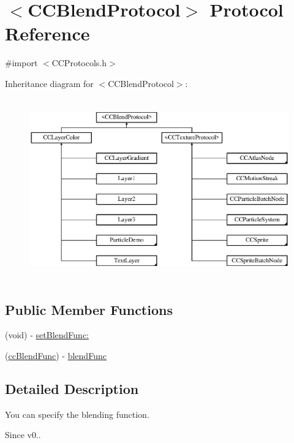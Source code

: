 \hypertarget{protocol_c_c_blend_protocol-p}{\section{$<$C\-C\-Blend\-Protocol$>$ Protocol Reference}
\label{protocol_c_c_blend_protocol-p}
}


{\ttfamily \#import $<$C\-C\-Protocols.\-h$>$}

Inheritance diagram for $<$C\-C\-Blend\-Protocol$>$\-:\begin{figure}[H]
\begin{center}
\leavevmode
\includegraphics[height=7.832168cm]{protocol_c_c_blend_protocol-p}
\end{center}
\end{figure}
\subsection*{Public Member Functions}
\begin{DoxyCompactItemize}
\item 
(void) -\/ \hyperlink{protocol_c_c_blend_protocol-p_aa3a90228bc3214dbd8448ed9e6a65756}{set\-Blend\-Func\-:}
\item 
(\hyperlink{cc_types_8h_a8c19c6f67219ecc0a6e4740cc046008d}{cc\-Blend\-Func}) -\/ \hyperlink{protocol_c_c_blend_protocol-p_a98989003bc4a8809a802527bad690786}{blend\-Func}
\end{DoxyCompactItemize}


\subsection{Detailed Description}
You can specify the blending function. \begin{DoxySince}{Since}
v0.. 
\end{DoxySince}


